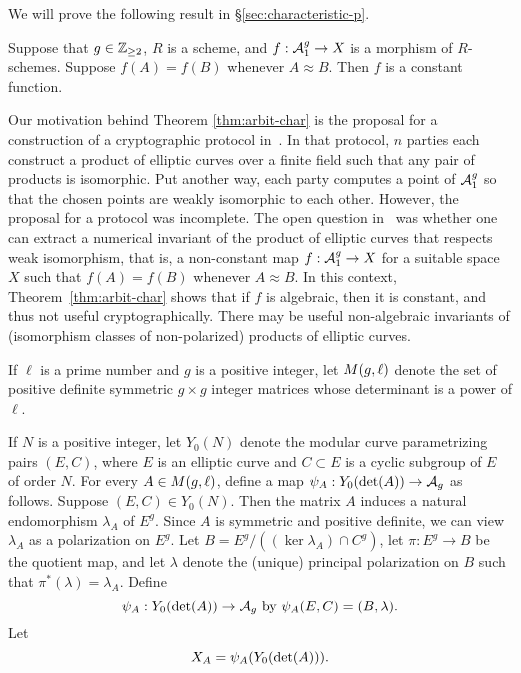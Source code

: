 \documentclass{amsart}
\begin{document}
We will prove the following result in \S\ref{sec:characteristic-p}.
\begin{theorem}\label{thm:arbit-char}
  Suppose that $g\in\mathbb{Z}_{\ge 2}$, $R$ is a scheme, and $f: \mathcal{A}_1^g \to X$ is a morphism of $R$-schemes. Suppose $f(A) = f(B)$ whenever $A \approx B$. Then $f$ is a constant function.
\end{theorem}

Our motivation behind Theorem \ref{thm:arbit-char} is the proposal for a construction of a cryptographic protocol in~\cite{multiparty}. In that protocol, $n$ parties each construct a product of elliptic curves over a finite field such that any pair of products is isomorphic. Put another way, each party computes a point of $\mathcal{A}_1^g$ so that the chosen points are weakly isomorphic to each other. However, the proposal for a protocol was incomplete. The open question in~\cite{multiparty} was whether one can extract a numerical invariant of the product of elliptic curves that respects weak isomorphism, that is, a non-constant map $f: \mathcal{A}_1^g \to X$ for a suitable space $X$ such that $f(A) = f(B)$ whenever $A \approx B$. In this context, Theorem~\ref{thm:arbit-char} shows that if $f$ is algebraic, then it is constant, and thus not useful cryptographically. There may be useful non-algebraic invariants of (isomorphism classes of non-polarized) products of elliptic curves.


\begin{definition}\label{def:detl}
If $\ell$ is a prime number and $g$ is a positive integer, let $M(g,\ell)$ denote the set of positive definite symmetric $g \times g$ integer matrices whose determinant is a power of $\ell$.
\end{definition}

If $N$ is a positive integer, let $Y_0(N)$ denote the modular curve parametrizing pairs $(E, C)$, where $E$ is an elliptic curve and $C \subset E$ is a cyclic subgroup of $E$ of order $N$. For every $A \in M(g,\ell)$, define a map $\psi_{A}: Y_0(\det(A)) \to \mathcal{A}_g$ as follows. Suppose $(E, C) \in Y_0(N)$. Then the matrix $A$ induces a natural endomorphism $\lambda_A$ of $E^g$. Since $A$ is symmetric and positive definite, we can view $\lambda_A$ as a polarization on $E^g$. Let $B = E^g/((\ker \lambda_A) \cap C^g)$, let $\pi: E^g \to B$ be the quotient map, and let $\lambda$ denote the (unique) principal polarization on $B$ such that $\pi^*(\lambda) = \lambda_A$. Define 
\begin{equation}\label{def:psimoddef}
\psi_{A}: Y_0(\det(A)) \to \mathcal{A}_g  \text{ by } \psi_{A}(E,C) = (B,\lambda).
\end{equation}
Let 
\begin{equation}\label{def:XAdef}
X_A=\psi_{A}(Y_0(\det(A))).
\end{equation}
\end{document}
